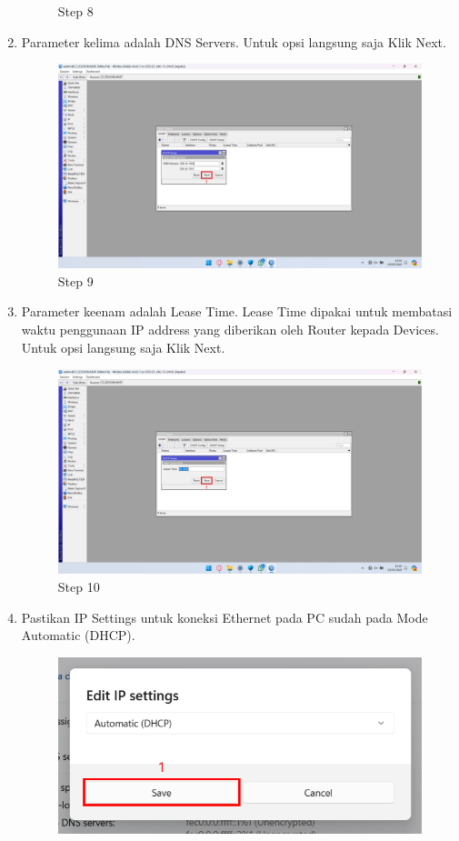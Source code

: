 \begin{center}
\begin{enumerate}
\begin{figure}[H]
			\caption{Step 8}
			\label{fig:Step 8}
		\end{figure}
        \item Parameter kelima adalah DNS Servers. Untuk opsi langsung saja Klik Next.
        \begin{figure}[H]
			\centering
			\includegraphics[width=0.8\linewidth]{P3/img/Step 9.png}
			\caption{Step 9}
			\label{fig:Step 9}
		\end{figure}
        \item Parameter keenam adalah Lease Time. Lease Time dipakai untuk membatasi waktu penggunaan IP address yang diberikan oleh Router kepada Devices. Untuk opsi langsung saja Klik Next.
        \begin{figure}[H]
			\centering
			\includegraphics[width=0.8\linewidth]{P3/img/Step 10.png}
			\caption{Step 10}
			\label{fig:Step 10}
		\end{figure}
        \item Pastikan IP Settings untuk koneksi Ethernet pada PC sudah pada Mode Automatic (DHCP).
        \begin{figure}[H]
			\centering
			\includegraphics[width=0.8\linewidth]{P3/img/Step 11.png}

\end{figure}
\end{enumerate}
\end{center}
